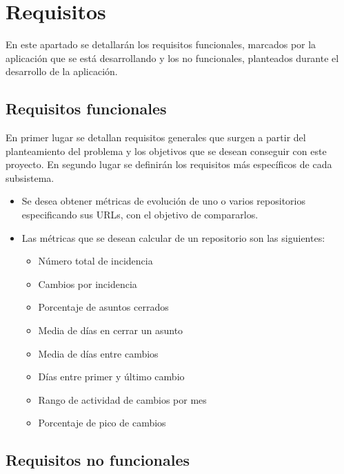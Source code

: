 
\section{Requisitos}
En este apartado se detallarán los requisitos funcionales, marcados por la aplicación que se está desarrollando y los no funcionales, planteados durante el desarrollo de la aplicación.
\subsection{Requisitos funcionales}
En primer lugar se detallan requisitos generales que surgen a partir del planteamiento del problema y los objetivos que se desean conseguir con este proyecto. En segundo lugar se definirán los requisitos más específicos de cada subsistema.
\begin{itemize}
	\item Se desea obtener métricas de evolución de uno o varios repositorios especificando sus URLs, con el objetivo de compararlos.
	\item Las métricas que se desean calcular de un repositorio son las siguientes:
	\begin{itemize}
		\item Número total de incidencia
		\item Cambios por incidencia
		\item Porcentaje de asuntos cerrados
		\item Media de días en cerrar un asunto
		\item Media de días entre cambios
		\item Días entre primer y último cambio
		\item Rango de actividad de cambios por mes
		\item Porcentaje de pico de cambios
	\end{itemize}
\end{itemize}
\subsection{Requisitos no funcionales}